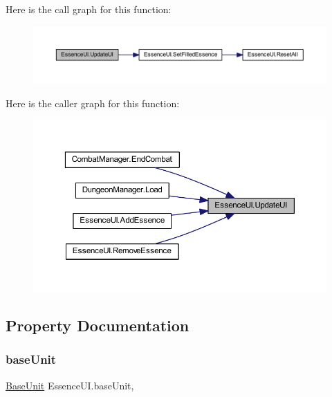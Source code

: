 Here is the call graph for this function\+:
\nopagebreak
\begin{figure}[H]
\begin{center}
\leavevmode
\includegraphics[width=350pt]{class_essence_u_i_a26023c3d4977188014384a1a40eb3ad9_cgraph}
\end{center}
\end{figure}
Here is the caller graph for this function\+:
\nopagebreak
\begin{figure}[H]
\begin{center}
\leavevmode
\includegraphics[width=350pt]{class_essence_u_i_a26023c3d4977188014384a1a40eb3ad9_icgraph}
\end{center}
\end{figure}


\subsection{Property Documentation}
\mbox{\label{class_essence_u_i_aa0f4e2e07a1b90d6656dbbbf34a459fe}} 
\subsubsection{\texorpdfstring{baseUnit}{baseUnit}}
{\footnotesize\ttfamily \mbox{\hyperlink{class_base_unit}{Base\+Unit}} Essence\+U\+I.\+base\+Unit\hspace{0.3cm}{\ttfamily [get]}, {\ttfamily [set]}}

